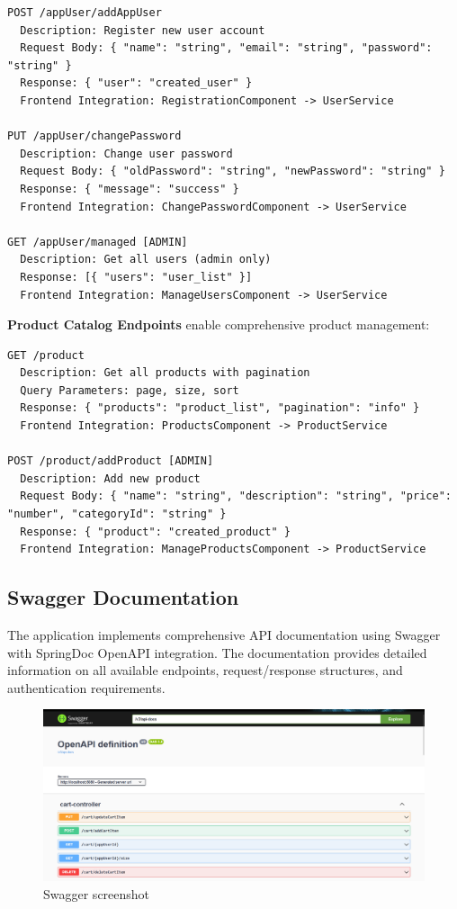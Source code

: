 \documentclass[12pt,a4paper]{article}
\begin{document}
\begin{lstlisting}[caption=User Management API Endpoints]
POST /appUser/addAppUser
  Description: Register new user account
  Request Body: { "name": "string", "email": "string", "password": "string" }
  Response: { "user": "created_user" }
  Frontend Integration: RegistrationComponent -> UserService

PUT /appUser/changePassword
  Description: Change user password
  Request Body: { "oldPassword": "string", "newPassword": "string" }
  Response: { "message": "success" }
  Frontend Integration: ChangePasswordComponent -> UserService

GET /appUser/managed [ADMIN]
  Description: Get all users (admin only)
  Response: [{ "users": "user_list" }]
  Frontend Integration: ManageUsersComponent -> UserService
\end{lstlisting}

\textbf{Product Catalog Endpoints} enable comprehensive product management:

\begin{lstlisting}[caption=Product Catalog API Endpoints]
GET /product
  Description: Get all products with pagination
  Query Parameters: page, size, sort
  Response: { "products": "product_list", "pagination": "info" }
  Frontend Integration: ProductsComponent -> ProductService

POST /product/addProduct [ADMIN]
  Description: Add new product
  Request Body: { "name": "string", "description": "string", "price": "number", "categoryId": "string" }
  Response: { "product": "created_product" }
  Frontend Integration: ManageProductsComponent -> ProductService
\end{lstlisting}

\subsection{Swagger Documentation}
The application implements comprehensive API documentation using Swagger with SpringDoc OpenAPI integration. The documentation provides detailed information on all available endpoints, request/response structures, and authentication requirements.

\begin{figure}[H]
    \centering
    \includegraphics[width=1.0\textwidth]{../image-3.png}
    \caption{Swagger screenshot}
\end{figure}
\end{document}
